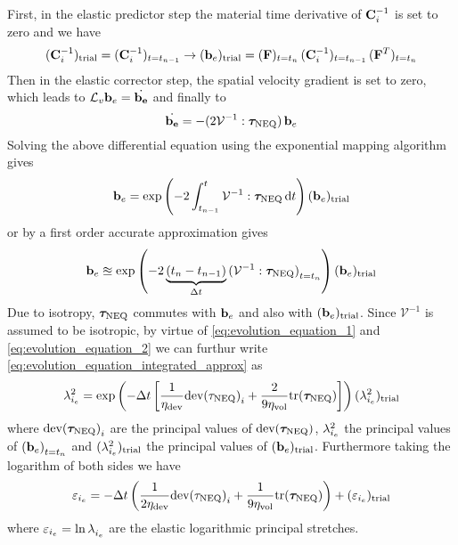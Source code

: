 First, in the elastic predictor step the material time derivative of \(\mathbf{C}_{i}^{-1}\) is set to zero and we have
\begin{equation}
    ({\mathbf{C}_{i}^{-1}})_\text{trial} = (\mathbf{C}_{i}^{-1})_{t=t_{n-1}} \rightarrow ({\mathbf{b}_{e}})_\text{trial} 
    = (\mathbf{F})_{t=t_{n}} \, (\mathbf{C}_{i}^{-1})_{t=t_{n-1}} \,(\mathbf{F}^{T})_{t=t_{n}}
    \label{eq:be_tr}
\end{equation}
Then in the elastic corrector step, the spatial velocity gradient is set to zero, which leads to \(\mathcal{L}_{v} \mathbf{b}_{e} = \dot{\mathbf{b}_{e}}\) and finally to 
\begin{equation}
    \dot{\mathbf{b}_{e}} = -(2\mathcal{V}^{-1} : \bm{\tau}_{\text{NEQ}}) \, \mathbf{b}_{e}
\end{equation} 
Solving the above differential equation using the exponential mapping algorithm gives
\begin{equation}
    \be = \exp \left( -2 \int_{t_{n-1}}^{t}  \mathcal{V}^{-1} : \tauneq \odif{t} \right) \tr{\be}
\end{equation}
or by a first order accurate approximation gives
\begin{equation}
    \mathbf{b}_{e} \approxeq \exp \left( -2 \underbrace{(t_{n} - t_{n-1})}_{\Delta t}  {(\mathcal{V}^{-1} : \bm{\tau}_{\text{NEQ}})}_{t=t_{n}}  \right) ({\mathbf{b}_{e}})_\text{trial}
    \label{eq:evolution_equation_integrated_approx}
\end{equation}
Due to isotropy, \(\bm{\tau}_{\text{NEQ}}\) commutes with \(\mathbf{b}_{e}\) and also with \(({\mathbf{b}_{e}})_\text{trial}\). Since \(\mathcal{V}^{-1}\) is assumed to be isotropic, by virtue of \cref{eq:evolution_equation_1} and \cref{eq:evolution_equation_2} we can furthur write \cref{eq:evolution_equation_integrated_approx} as
\begin{equation}
    \lambda^{2}_{{i}_e} = \exp \left( - \Delta t \left[ \frac{1}{\eta_{\text{dev}}} {\text{dev}({\tau}_{\text{NEQ}})}_{i} + \frac{2}{9\eta_{\text{vol}}} \text{tr}(\bm{\tau}_{\text{NEQ}}) \right] \right) ({\lambda^{2}_{{i}_e}})_\text{trial}
\end{equation}
where \(\text{dev}{(\bm{\tau}_{\text{NEQ}})}_{i}\) are the principal values of \(\text{dev}{(\bm{\tau}_{\text{NEQ}})}\), \(\lambda^{2}_{{i}_e}\) the principal values of \({(\mathbf{b}_{e})}_{t=t_{n}}\) and \(({\lambda^{2}_{{i}_e}})_\text{trial}\) the principal values of \(({\mathbf{b}_{e}})_\text{trial}\). Furthermore taking the logarithm of both sides we have
\begin{equation}
    \varepsilon_{{i}_e} = - \Delta t \left( \frac{1}{2\eta_{\text{dev}}} {\text{dev}({\tau}_{\text{NEQ}})}_{i} + \frac{1}{9\eta_{\text{vol}}} \text{tr}(\bm{\tau}_{\text{NEQ}}) \right) + ({\varepsilon_{{i}_e}})_\text{trial}
    \label{eq:principal_strain_neq}
\end{equation} 
where \(\varepsilon_{{i}_e} = \ln\lambda^{}_{{i}_e}\) are the elastic logarithmic principal stretches.

